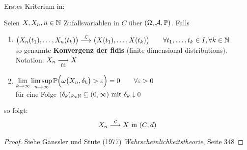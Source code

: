 

Erstes Kriterium in:

\begin{satz}\label{satz7.9}
	Seien $X,X_n,n\in\N$ Zufallsvariablen in $C$ über $(\Omega,\A,\P)$. Falls
	\begin{enumerate}[label=(\arabic*)]
		\item $\begin{aligned}
			\big(X_n(t_1),\ldots,X_n(t_k)\big)\stackrel{\L}{\longrightarrow}\big(X(t_1),\ldots,X(t_k)\big)
			\qquad\forall t_1,\ldots,t_k\in I,\forall k\in\N
		\end{aligned}$\\
		so genannte \textbf{Konvergenz der fidis} (finite dimensional distributions).\\
		Notation: $X_n\stackrelnew{\text{fd}}{}{\longrightarrow} X$
		\item $\begin{aligned}
			\lim\limits_{k\to\infty}\limsup\limits_{n\to\infty}\P\Big(\omega\big(X_n,\delta_k\big)>\varepsilon\Big)=0\qquad\forall\varepsilon>0
		\end{aligned}$\\
		für eine Folge $(\delta_k)_{k\in\N}\subseteq(0,\infty)\mit\delta_k\downarrow0$
	\end{enumerate}
	so folgt:
	\begin{align*}
		X_n\stackrel{\L}{\longrightarrow}X\text{ in }(C,d)
	\end{align*}
\end{satz}

\begin{proof}
	Siehe Gänssler und Stute (1977) \textit{Wahrscheinlichkeitstheorie}, Seite 348
\end{proof}

